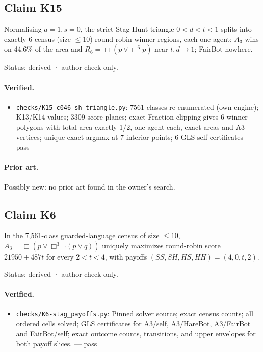 \documentclass{article}
\begin{document}
\subsection*{Claim K15}

Normalising $a=1,s=0$, the strict Stag Hunt triangle $0<d<t<1$ splits into exactly 6 census (size $\le10$) round-robin winner regions, each one agent; $A_3$ wins on 44.6\% of the area and $R_6=\Box(p\lor\Box^6p)$ near $t,d\to1$; FairBot nowhere.

Status: derived · author check only.

\paragraph{Verified.}
\begin{itemize}
\item \texttt{checks/K15-c046\_sh\_triangle.py}: 7561 classes re-enumerated (own engine); K13/K14 values; 3309 score planes; exact Fraction clipping gives 6 winner polygons with total area exactly 1/2, one agent each, exact areas and A3 vertices; unique exact argmax at 7 interior points; 6 GLS self-certificates --- pass
\end{itemize}

\paragraph{Prior art.} Possibly new: no prior art found in the owner's search.

\subsection*{Claim K6}

In the 7,561-class guarded-language census of size $\le10$, $A_3=\Box(p\lor\Box^3\neg(p\lor q))$ uniquely maximizes round-robin score $21950+487t$ for every $2<t<4$, with payoffs $(SS,SH,HS,HH)=(4,0,t,2)$.

Status: derived · author check only.

\paragraph{Verified.}
\begin{itemize}
\item \texttt{checks/K6-stag\_payoffs.py}: Pinned solver source; exact census counts; all ordered cells solved; GLS certificates for A3/self, A3/HareBot, A3/FairBot and FairBot/self; exact outcome counts, transitions, and upper envelopes for both payoff slices. --- pass
\end{itemize}
\end{document}
